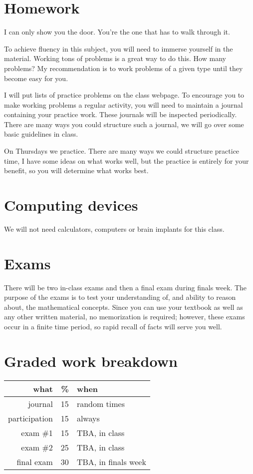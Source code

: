 \documentclass[12pt]{article}
\begin{document}
\section*{Homework} 
\epigraph{I can only show you the door. You're the one that has to walk through it.}{}
To achieve fluency in this subject, you will need to immerse yourself in the material.  
Working tons of problems is a great way to do this.  How many problems?  
My recommendation is to work problems of a given type until they become easy for you.

I will put lists of practice problems on the class webpage. 
To encourage you to make working problems a regular activity, you will need to maintain a journal containing your practice work.
These journals will be inspected periodically.  There are many ways you could structure such a journal, we will go over some
basic guidelines in class.

On Thursdays we practice.  There are many ways we could structure practice time, I have some ideas on what works well, but the practice is
entirely for your benefit, so you will determine what works best.

\section*{Computing devices}
We will not need calculators, computers or brain implants for this class.  

\section*{Exams}
There will be two in-class exams and then a final exam during finals week. 
The purpose of the exams is to test your understanding of, and ability to reason about, the mathematical concepts. 
Since you can use your textbook as well as any other written material, no memorization is required; however, 
these exams occur in a finite time period, so rapid recall of facts will serve you well. 

\section*{Graded work breakdown}
\begin{tabular}{r | r | l}
what & \% & when \\
\hline
journal & 15 & random times \\
participation & 15 & always\\
exam \#1 & 15 & TBA, in class \\
exam \#2 & 25 & TBA, in class \\
final exam & 30 & TBA, in finals week \\
\end{tabular}
\end{document}
